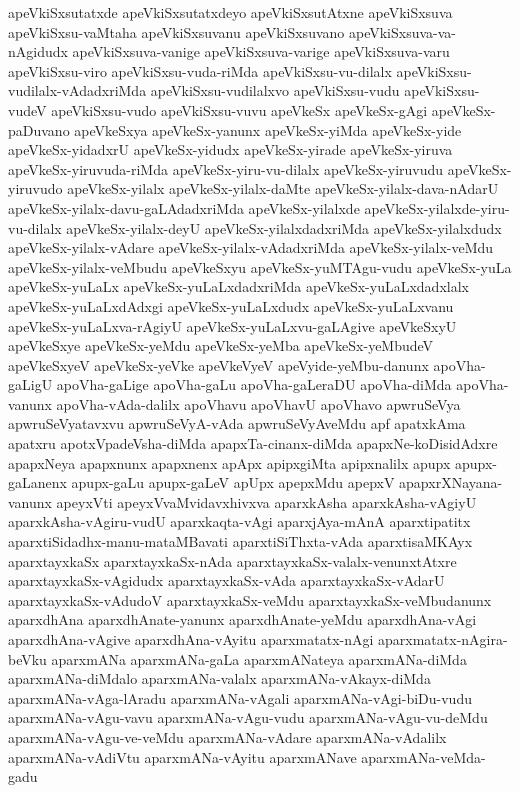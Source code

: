 {apeVkiSxsutatxde
apeVkiSxsutatxdeyo
apeVkiSxsutAtxne
apeVkiSxsuva
apeVkiSxsu-vaMtaha
apeVkiSxsuvanu
apeVkiSxsuvano
apeVkiSxsuva-va-nAgidudx
apeVkiSxsuva-vanige
apeVkiSxsuva-varige
apeVkiSxsuva-varu
apeVkiSxsu-viro
apeVkiSxsu-vuda-riMda
apeVkiSxsu-vu-dilalx
apeVkiSxsu-vudilalx-vAdadxriMda
apeVkiSxsu-vudilalxvo
apeVkiSxsu-vudu
apeVkiSxsu-vudeV
apeVkiSxsu-vudo
apeVkiSxsu-vuvu
apeVkeSx
apeVkeSx-gAgi
apeVkeSx-paDuvano
apeVkeSxya
apeVkeSx-yanunx
apeVkeSx-yiMda
apeVkeSx-yide
apeVkeSx-yidadxrU
apeVkeSx-yidudx
apeVkeSx-yirade
apeVkeSx-yiruva
apeVkeSx-yiruvuda-riMda
apeVkeSx-yiru-vu-dilalx
apeVkeSx-yiruvudu
apeVkeSx-yiruvudo
apeVkeSx-yilalx
apeVkeSx-yilalx-daMte
apeVkeSx-yilalx-dava-nAdarU
apeVkeSx-yilalx-davu-gaLAdadxriMda
apeVkeSx-yilalxde
apeVkeSx-yilalxde-yiru-vu-dilalx
apeVkeSx-yilalx-deyU
apeVkeSx-yilalxdadxriMda
apeVkeSx-yilalxdudx
apeVkeSx-yilalx-vAdare
apeVkeSx-yilalx-vAdadxriMda
apeVkeSx-yilalx-veMdu
apeVkeSx-yilalx-veMbudu
apeVkeSxyu
apeVkeSx-yuMTAgu-vudu
apeVkeSx-yuLa
apeVkeSx-yuLaLx
apeVkeSx-yuLaLxdadxriMda
apeVkeSx-yuLaLxdadxlalx
apeVkeSx-yuLaLxdAdxgi
apeVkeSx-yuLaLxdudx
apeVkeSx-yuLaLxvanu
apeVkeSx-yuLaLxva-rAgiyU
apeVkeSx-yuLaLxvu-gaLAgive
apeVkeSxyU
apeVkeSxye
apeVkeSx-yeMdu
apeVkeSx-yeMba
apeVkeSx-yeMbudeV
apeVkeSxyeV
apeVkeSx-yeVke
apeVkeVyeV
apeVyide-yeMbu-danunx
apoVha-gaLigU
apoVha-gaLige
apoVha-gaLu
apoVha-gaLeraDU
apoVha-diMda
apoVha-vanunx
apoVha-vAda-dalilx
apoVhavu
apoVhavU
apoVhavo
apwruSeVya
apwruSeVyatavxvu
apwruSeVyA-vAda
apwruSeVyAveMdu
apf
apatxkAma
apatxru
apotxVpadeVsha-diMda
apapxTa-cinanx-diMda
apapxNe-koDisidAdxre
apapxNeya
apapxnunx
apapxnenx
apApx
apipxgiMta
apipxnalilx
apupx
apupx-gaLanenx
apupx-gaLu
apupx-gaLeV
apUpx
apepxMdu
apepxV
apapxrXNayana-vanunx
apeyxVti
apeyxVvaMvidavxhivxva
aparxkAsha
aparxkAsha-vAgiyU
aparxkAsha-vAgiru-vudU
aparxkaqta-vAgi
aparxjAya-mAnA
aparxtipatitx
aparxtiSidadhx-manu-mataMBavati
aparxtiSiThxta-vAda
aparxtisaMKAyx
aparxtayxkaSx
aparxtayxkaSx-nAda
aparxtayxkaSx-valalx-venunxtAtxre
aparxtayxkaSx-vAgidudx
aparxtayxkaSx-vAda
aparxtayxkaSx-vAdarU
aparxtayxkaSx-vAdudoV
aparxtayxkaSx-veMdu
aparxtayxkaSx-veMbudanunx
aparxdhAna
aparxdhAnate-yanunx
aparxdhAnate-yeMdu
aparxdhAna-vAgi
aparxdhAna-vAgive
aparxdhAna-vAyitu
aparxmatatx-nAgi
aparxmatatx-nAgira-beVku
aparxmANa
aparxmANa-gaLa
aparxmANateya
aparxmANa-diMda
aparxmANa-diMdalo
aparxmANa-valalx
aparxmANa-vAkayx-diMda
aparxmANa-vAga-lAradu
aparxmANa-vAgali
aparxmANa-vAgi-biDu-vudu
aparxmANa-vAgu-vavu
aparxmANa-vAgu-vudu
aparxmANa-vAgu-vu-deMdu
aparxmANa-vAgu-ve-veMdu
aparxmANa-vAdare
aparxmANa-vAdalilx
aparxmANa-vAdiVtu
aparxmANa-vAyitu
aparxmANave
aparxmANa-veMda-gadu
}

